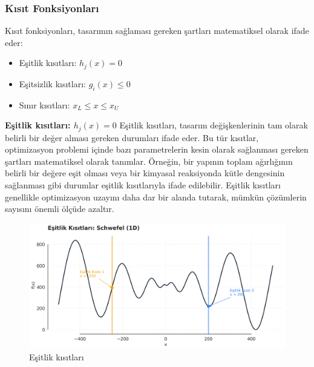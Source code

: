 \subsubsection{Kısıt Fonksiyonları}
Kısıt fonksiyonları, tasarımın sağlaması gereken şartları matematiksel olarak ifade eder:
\begin{itemize}
    \item Eşitlik kısıtları: $h_j(x) = 0$
    \item Eşitsizlik kısıtları: $g_i(x) \leq 0$
    \item Sınır kısıtları: $x_L \leq x \leq x_U$ 
\end{itemize}


\textbf{Eşitlik kısıtları: $h_j(x) = 0$}
Eşitlik kısıtları, tasarım değişkenlerinin tam olarak belirli bir değer alması gereken durumları ifade eder. Bu tür kısıtlar, optimizasyon problemi içinde bazı parametrelerin kesin olarak sağlanması gereken şartları matematiksel olarak tanımlar. Örneğin, bir yapının toplam ağırlığının belirli bir değere eşit olması veya bir kimyasal reaksiyonda kütle dengesinin sağlanması gibi durumlar eşitlik kısıtlarıyla ifade edilebilir. Eşitlik kısıtları genellikle optimizasyon uzayını daha dar bir alanda tutarak, mümkün çözümlerin sayısını önemli ölçüde azaltır.


\begin{figure}[H]
    \centering
    \includegraphics[width=1\textwidth]{weeks_new/imgs/equality_constraints.png}
    \caption{Eşitlik kısıtları}
    \label{fig:}
\end{figure}

